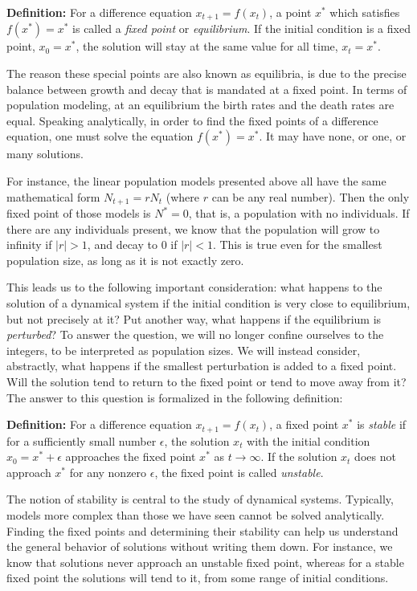 \documentclass[11pt]{book}
\begin{document}
\textbf{Definition:} For a difference equation $x_{t+1} = f(x_t)$, a point $x^*$ which satisfies $f(x^*)=x^*$ is called a \emph{fixed point} or \emph{equilibrium}. If the initial condition is a fixed point, $x_0=x^*$, the solution will stay at the same value for all time, $x_t=x^*$.

The reason these special points are also known as equilibria, is due to the precise balance between growth and decay that is mandated at a fixed point. In terms of population modeling, at an equilibrium the birth rates and the death rates are equal. Speaking analytically, in order to find the fixed points of a difference equation, one must solve the equation $f(x^*) = x^*$. It may have none, or one, or many solutions.

For instance, the linear population models presented above all have the same mathematical form $N_{t+1}= r N_t$ (where $r$ can be any real number). Then the only fixed point of those models is $N^* = 0$, that is, a population with no individuals. If there are any individuals present, we know that the population will grow to infinity if $|r| > 1$, and decay to 0 if $|r| < 1$. This is true even for the smallest population size, as long as it is not exactly zero.

This leads us to the following important consideration: what happens to the solution of a dynamical system if the initial condition is very close to equilibrium, but not precisely at it? Put another way, what happens if the equilibrium is \emph{perturbed}? To answer the question, we will no longer confine ourselves to the integers, to be interpreted as population sizes. We will instead consider, abstractly, what happens if the smallest perturbation is added to a fixed point. Will the solution tend to return to the fixed point or tend to move away from it? The answer to this question is formalized in the following definition:

\textbf{Definition:} For a difference equation $x_{t+1} = f(x_t)$, a fixed point $x^*$ is \emph{stable} if for a sufficiently small number $\epsilon$, the solution $x_t$ with the initial condition $x_0 = x^* + \epsilon$ approaches the fixed point $x^*$ as $t \rightarrow \infty$. If the solution $x_t$ does not approach $x^*$ for any nonzero $\epsilon$, the fixed point is called \emph{unstable}.

The notion of stability is central to the study of dynamical systems. Typically, models more complex than those we have seen cannot be solved analytically. Finding the fixed points and determining their stability can help us understand the general behavior of solutions without writing them down. For instance, we know that solutions never approach an unstable fixed point, whereas for a stable fixed point the solutions will tend to it, from some range of initial conditions.
\end{document}
